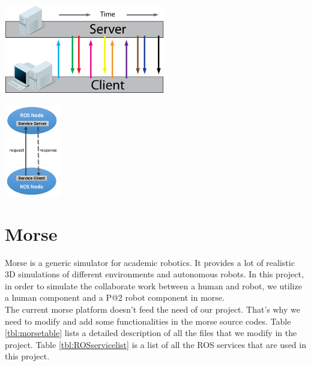 \begin{minipage}{0.4\textwidth}
\centering
	\includegraphics[width=7cm]{Pictures/func/webSocket.png}
	\label{fig:webSocket}
\end{minipage}
\quad\quad\quad\quad
\begin{minipage}{0.4\textwidth}
\centering
	\includegraphics[height=4cm]{Pictures/func/ROSservice.png}
	\label{fig:ROSservice}
\end{minipage}

\section{Morse}
Morse is a generic simulator for academic robotics. It provides a lot of realistic 3D simulations of different environments and autonomous robots. In this project, in order to simulate the collaborate work between a human and robot, we utilize a human component and a P@2 robot component in morse.\\
The current morse platform doesn't feed the need of our project. That's why we need to modify and add some functionalities in the morse source codes. Table \ref{tbl:morsetable} lists a detailed description of all the files that we modify in the project. Table \ref{tbl:ROSservicelist} is a list of all the ROS services that are used in this project.
 
